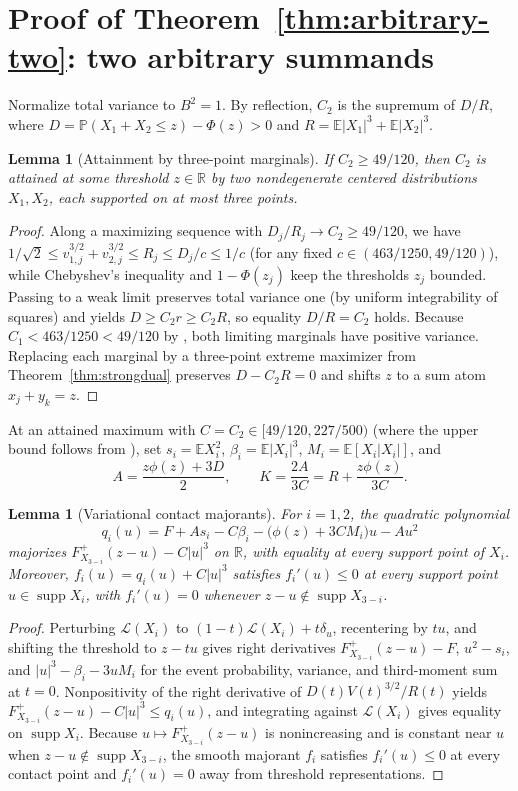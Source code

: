 \documentclass[11pt]{article}
\numberwithin{equation}{section}
\newtheorem{lemma}[theorem]{Lemma}
\theoremstyle{definition}
\theoremstyle{remark}
\DeclareMathOperator{\supp}{supp}
\newcommand{\E}{\mathbb E}
\newcommand{\Pp}{\mathbb P}
\newcommand{\R}{\mathbb R}
\begin{document}
\section{Proof of Theorem~\ref{thm:arbitrary-two}: two arbitrary summands}\label{sec:arbitrary-two}

Normalize total variance to $B^2=1$. By reflection, $C_2$ is the supremum of
$D/R$, where $D=\Pp(X_1+X_2\le z)-\Phi(z)>0$ and $R=\E|X_1|^3+\E|X_2|^3$.

\begin{lemma}[Attainment by three-point marginals]\label{lem:c2-attainment}
If $C_2\ge49/120$, then $C_2$ is attained at some threshold $z\in\R$ by two
nondegenerate centered distributions $X_1,X_2$, each supported on at most
three points.
\end{lemma}
\begin{proof}
Along a maximizing sequence with $D_j/R_j\to C_2\ge49/120$, we have
$1/\sqrt2\le v_{1,j}^{3/2}+v_{2,j}^{3/2}\le R_j\le D_j/c\le1/c$ (for any fixed
$c\in(463/1250,49/120)$), while Chebyshev's inequality and $1-\Phi(z_j)$ keep
the thresholds $z_j$ bounded. Passing to a weak limit preserves total
variance one (by uniform integrability of squares) and yields $D\ge C_2r\ge C_2R$,
so equality $D/R=C_2$ holds. Because $C_1<463/1250<49/120$ by
\citet[Theorem~1]{BentkusKirsa1989}, both limiting marginals have positive
variance. Replacing each marginal by a three-point extreme maximizer from
Theorem~\ref{thm:strongdual} preserves $D-C_2R=0$ and shifts $z$ to a sum
atom $x_j+y_k=z$.
\end{proof}

At an attained maximum with $C=C_2\in[49/120,227/500)$ (where the upper bound
follows from \citet{BellIndependent2026}), set $s_i=\E X_i^2$,
$\beta_i=\E|X_i|^3$, $M_i=\E[X_i|X_i|]$, and
\[
 A=\frac{z\phi(z)+3D}{2},\qquad
 K=\frac{2A}{3C}=R+\frac{z\phi(z)}{3C}.
\]

\begin{lemma}[Variational contact majorants]\label{lem:full-law-contacts}
For $i=1,2$, the quadratic polynomial
\[
 q_i(u)=F+A s_i-C\beta_i-\bigl(\phi(z)+3CM_i\bigr)u-Au^2
\]
majorizes $F_{X_{3-i}}^+(z-u)-C|u|^3$ on $\R$, with equality at every support
point of $X_i$. Moreover, $f_i(u)=q_i(u)+C|u|^3$ satisfies $f_i'(u)\le0$ at
every support point $u\in\supp X_i$, with $f_i'(u)=0$ whenever $z-u\notin\supp X_{3-i}$.
\end{lemma}
\begin{proof}
Perturbing $\mathcal L(X_i)$ to $(1-t)\mathcal L(X_i)+t\delta_u$, recentering
by $tu$, and shifting the threshold to $z-tu$ gives right derivatives
$F_{X_{3-i}}^+(z-u)-F$, $u^2-s_i$, and $|u|^3-\beta_i-3uM_i$ for the event
probability, variance, and third-moment sum at $t=0$. Nonpositivity of the
right derivative of $D(t)V(t)^{3/2}/R(t)$ yields $F_{X_{3-i}}^+(z-u)-C|u|^3\le q_i(u)$,
and integrating against $\mathcal L(X_i)$ gives equality on $\supp X_i$.
Because $u\mapsto F_{X_{3-i}}^+(z-u)$ is nonincreasing and is constant near
$u$ when $z-u\notin\supp X_{3-i}$, the smooth majorant $f_i$ satisfies
$f_i'(u)\le0$ at every contact point and $f_i'(u)=0$ away from threshold
representations.
\end{proof}
\end{document}
